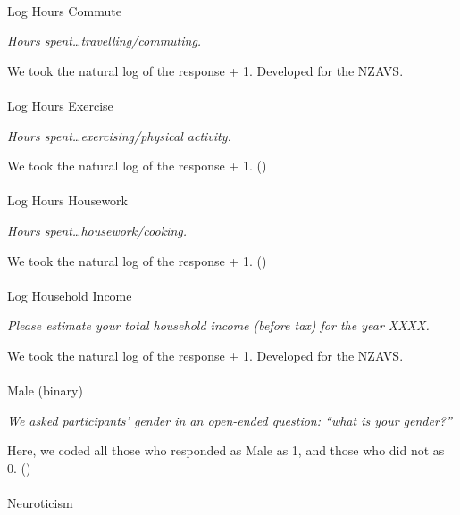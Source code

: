 \documentclass[
  single column]{article}
\makeatletter
\let\oldparagraph\paragraph
\renewcommand{\paragraph}{
    \@ifstar
      \xxxParagraphStar
      \xxxParagraphNoStar
  }
\newcommand{\xxxParagraphStar}[1]{\oldparagraph*{#1}\mbox{}}
\newcommand{\xxxParagraphNoStar}[1]{\oldparagraph{#1}\mbox{}}
\makeatother
\begin{document}
\paragraph{Log Hours Commute}\label{log-hours-commute}

\emph{Hours spent\ldots travelling/commuting.}

We took the natural log of the response + 1. Developed for the NZAVS.

\paragraph{Log Hours Exercise}\label{log-hours-exercise}

\emph{Hours spent\ldots exercising/physical activity.}

We took the natural log of the response + 1.
()

\paragraph{Log Hours Housework}\label{log-hours-housework}

\emph{Hours spent\ldots housework/cooking.}

We took the natural log of the response + 1.
()

\paragraph{Log Household Income}\label{log-household-income}

\emph{Please estimate your total household income (before tax) for the
year XXXX.}

We took the natural log of the response + 1. Developed for the NZAVS.

\paragraph{Male (binary)}\label{male-binary}

\emph{We asked participants' gender in an open-ended question: ``what is
your gender?''}

Here, we coded all those who responded as Male as 1, and those who did
not as 0. ()

\paragraph{Neuroticism}\label{neuroticism}
\end{document}
